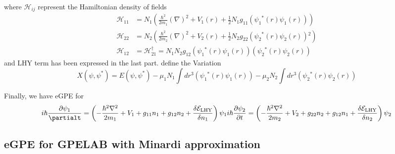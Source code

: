 where $\mathcal{H}_{ij}$ represent the Hamiltonian density of fields
\begin{equation}
\begin{split}
\mathcal{H}_{11}&=N_1\left(\frac{\hbar ^2}{2m_1}(\nabla )^2+V_1(r)+\frac{1}{2}N_1g_{11}\left(\psi _1{}^*(r)\psi _1(r)\right)\right)\\
\mathcal{H}_{22}&=N_2\left(\frac{\hbar ^2}{2m_2}(\nabla )^2+V_2(r)+\frac{1}{2}N_2g_{22}\left(\psi _2{}^*(r)\psi _2(r)\right){}^2\right)\\
\mathcal{H}_{12}&=\mathcal{H}_{21}^{\dagger }=N_1N_2g_{12}\left(\psi _1{}^*(r)\psi _1(r)\right)\left(\psi _2{}^*(r)\psi _2(r)\right)
\end{split}
\end{equation}
and LHY term has been expressed in the last part.
define the Variation
\begin{equation}
X\left(\psi ,\psi ^*\right)=E\left(\psi ,\psi ^*\right)-\mu _1 N_1\int dr^3\left(\psi _1{}^*(r)\psi _1(r)\right)-\mu _2 N_2\int dr^3\left(\psi
_2{}^*(r)\psi _2(r)\right)
\end{equation}

Finally, we have eGPE for 
\begin{equation}
i \hbar \frac{\partial\psi_1}{\partialt}=\left(-\frac{\hbar^2\nabla^2}{2m_1}+V_1+g_{11}n_1+g_{12}n_2+\frac{\delta  \mathcal{E}_{\text{LHY}}}{\delta n_1}\right)\psi _1\\
i \hbar \frac{\partial \psi _2}{\partial t}=\left(-\frac{\hbar ^2\nabla ^2}{2m_2}+V_2+g_{22}n_2+g_{12}n_1+\frac{\delta  \mathcal{E}_{\text{LHY}}}{\delta n_2}\right)\psi _2
\end{equation}

\subsection{eGPE for GPELAB with Minardi approximation}

